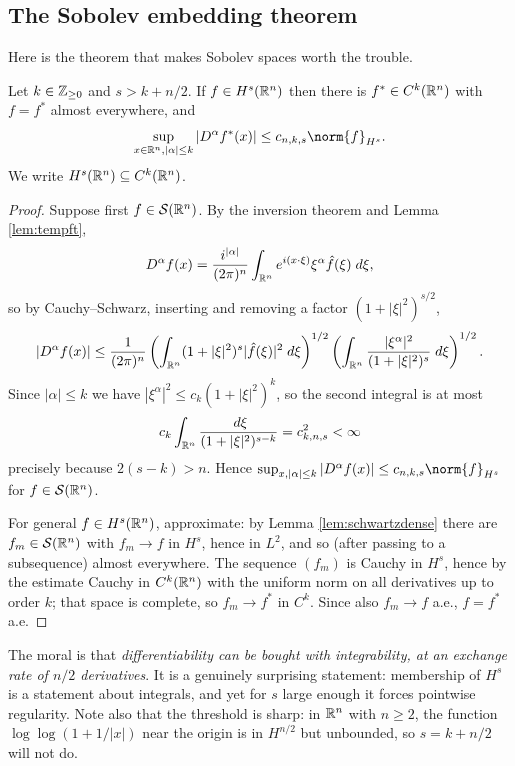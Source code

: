 \documentclass[a4paper]{scrartcl}
\newcommand{\Sch}{\mathcal{S}}
\begin{document}
\subsection{The Sobolev embedding theorem}

Here is the theorem that makes Sobolev spaces worth the trouble.

\begin{theorem}\label{thm:sobolevembed}
	Let $k\in\mathbb{Z}_{\ge0}$ and $s > k + n/2$. If $f \in H^s(\mathbb{R}^n)$ then there is $f^*\in C^k(\mathbb{R}^n)$ with $f = f^*$ almost everywhere, and
	$$\sup_{x\in\R^n,|\alpha|\le k}|D^\alpha f^*(x)|\le c_{n,k,s}\norm{f}_{H^s}.$$
	We write $H^s(\mathbb{R}^n)\subseteq C^k(\mathbb{R}^n)$.
\end{theorem}

\begin{proof}
	Suppose first $f\in\Sch(\R^n)$. By the inversion theorem and Lemma \ref{lem:tempft},
	$$D^\alpha f(x)=\frac{i^{|\alpha|}}{(2\pi)^n}\int_{\mathbb{R}^n}e^{i(x\cdot\xi)}\xi^\alpha\hat f(\xi)\; d\xi,$$
	so by Cauchy--Schwarz, inserting and removing a factor $(1+|\xi|^2)^{s/2}$,
	$$|D^\alpha f(x)|\le\frac{1}{(2\pi)^n}\left(\int_{\mathbb{R}^n}(1+|\xi|^2)^s|\hat f(\xi)|^2\; d\xi\right)^{1/2}\left(\int_{\mathbb{R}^n}\frac{|\xi^\alpha|^2}{(1+|\xi|^2)^s}\; d\xi\right)^{1/2}.$$
	Since $|\alpha|\le k$ we have $|\xi^\alpha|^2\le c_k(1+|\xi|^2)^k$, so the second integral is at most
	$$c_k\int_{\mathbb{R}^n}\frac{\; d\xi}{(1+|\xi|^2)^{s-k}}=c^2_{k,n,s}<\infty$$
	precisely because $2(s-k)>n$. Hence $\sup_{x,|\alpha|\le k}|D^\alpha f(x)|\le c_{n,k,s}\norm{f}_{H^s}$ for $f\in\Sch(\R^n)$.

	For general $f \in H^s(\mathbb{R}^n)$, approximate: by Lemma \ref{lem:schwartzdense} there are $f_m\in\Sch(\R^n)$ with $f_m\to f$ in $H^s$, hence in $L^2$, and so (after passing to a subsequence) almost everywhere. The sequence $(f_m)$ is Cauchy in $H^s$, hence by the estimate Cauchy in $C^k(\mathbb{R}^n)$ with the uniform norm on all derivatives up to order $k$; that space is complete, so $f_m\to f^*$ in $C^k$. Since also $f_m\to f$ a.e., $f = f^*$ a.e.
\end{proof}

The moral is that \emph{differentiability can be bought with integrability, at an exchange rate of $n/2$ derivatives}. It is a genuinely surprising statement: membership of $H^s$ is a statement about integrals, and yet for $s$ large enough it forces pointwise regularity. Note also that the threshold is sharp: in $\mathbb{R}^n$ with $n \ge 2$, the function $\log\log(1+1/|x|)$ near the origin is in $H^{n/2}$ but unbounded, so $s = k+n/2$ will not do.
\end{document}
